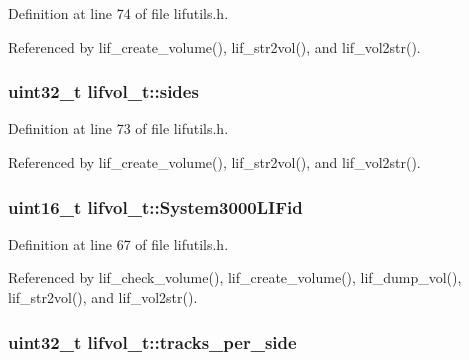Definition at line 74 of file lifutils.\+h.



Referenced by lif\+\_\+create\+\_\+volume(), lif\+\_\+str2vol(), and lif\+\_\+vol2str().

\subsubsection[{\texorpdfstring{sides}{sides}}]{\setlength{\rightskip}{0pt plus 5cm}uint32\+\_\+t lifvol\+\_\+t\+::sides}\hypertarget{structlifvol__t_a5b8ecfb441b010f69cb90b923cc50719}{}\label{structlifvol__t_a5b8ecfb441b010f69cb90b923cc50719}


Definition at line 73 of file lifutils.\+h.



Referenced by lif\+\_\+create\+\_\+volume(), lif\+\_\+str2vol(), and lif\+\_\+vol2str().

\subsubsection[{\texorpdfstring{System3000\+L\+I\+Fid}{System3000LIFid}}]{\setlength{\rightskip}{0pt plus 5cm}uint16\+\_\+t lifvol\+\_\+t\+::\+System3000\+L\+I\+Fid}\hypertarget{structlifvol__t_a98097f8c951448cbab6019b7b703e4d0}{}\label{structlifvol__t_a98097f8c951448cbab6019b7b703e4d0}


Definition at line 67 of file lifutils.\+h.



Referenced by lif\+\_\+check\+\_\+volume(), lif\+\_\+create\+\_\+volume(), lif\+\_\+dump\+\_\+vol(), lif\+\_\+str2vol(), and lif\+\_\+vol2str().

\subsubsection[{\texorpdfstring{tracks\+\_\+per\+\_\+side}{tracks_per_side}}]{\setlength{\rightskip}{0pt plus 5cm}uint32\+\_\+t lifvol\+\_\+t\+::tracks\+\_\+per\+\_\+side}\hypertarget{structlifvol__t_aae9e5135f98b80312eb785ac3747fc31}{}\label{structlifvol__t_aae9e5135f98b80312eb785ac3747fc31}


